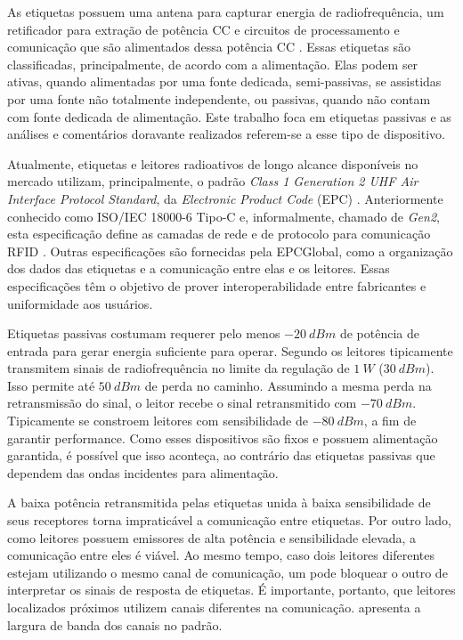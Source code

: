 As etiquetas possuem uma antena para capturar energia de radiofrequência, um retificador para extração de potência {CC} e circuitos de processamento e comunicação que são alimentados dessa potência {CC} \cite{MANDAL:2007}. Essas etiquetas são classificadas, principalmente, de acordo com a alimentação. Elas podem ser ativas, quando alimentadas por uma fonte dedicada, semi-passivas, se assistidas por uma fonte não totalmente independente, ou passivas, quando não contam com fonte dedicada de alimentação. Este trabalho foca em etiquetas passivas e as análises e comentários doravante realizados referem-se a esse tipo de dispositivo.

Atualmente, etiquetas e leitores radioativos de longo alcance disponíveis no mercado utilizam, principalmente, o padrão \textit{Class 1 Generation 2 UHF Air Interface Protocol Standard}, da \textit{Electronic Product Code} (EPC) \cite{EPCGLOBAL:2009}. Anteriormente conhecido como ISO/IEC 18000-6 Tipo-C e, informalmente, chamado de \textit{Gen2}, esta especificação define as camadas de rede e de protocolo para comunicação {RFID} \cite{YEAGER:2009}. Outras especificações são fornecidas pela {EPCGlobal}, como a organização dos dados das etiquetas e a comunicação entre elas e os leitores. Essas especificações têm o objetivo de prover interoperabilidade entre fabricantes e uniformidade aos usuários.

Etiquetas passivas costumam requerer pelo menos $-20~dBm$ de potência de entrada para gerar energia suficiente para operar. Segundo  os leitores tipicamente transmitem sinais de radiofrequência no limite da regulação de $1~W$ ($30~dBm$). Isso permite até $50~dBm$ de perda no caminho. Assumindo a mesma perda na retransmissão do sinal, o leitor recebe o sinal retransmitido com $-70~dBm$. Tipicamente se constroem leitores com sensibilidade de $-80~dBm$, a fim de garantir performance. Como esses dispositivos são fixos e possuem alimentação garantida, é possível que isso aconteça, ao contrário das etiquetas passivas que dependem das ondas incidentes para alimentação.

A baixa potência retransmitida pelas etiquetas unida à baixa sensibilidade de seus receptores torna impraticável a comunicação entre etiquetas. Por outro lado, como leitores possuem emissores de alta potência e sensibilidade elevada, a comunicação entre eles é viável. Ao mesmo tempo, caso dois leitores diferentes estejam utilizando o mesmo canal de comunicação, um pode bloquear o outro de interpretar os sinais de resposta de etiquetas. É importante, portanto, que leitores localizados próximos utilizem canais diferentes na comunicação.  apresenta a largura de banda dos canais no padrão.

